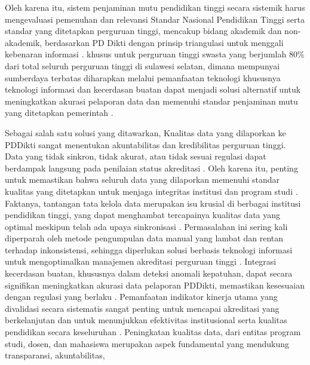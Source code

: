 \documentclass[12pt,a4paper,oneside]{report}
\begin{document}
            Oleh karena itu, sistem penjaminan mutu pendidikan tinggi secara sistemik harus mengevaluasi pemenuhan dan relevansi Standar Nasional Pendidikan Tinggi serta standar yang ditetapkan perguruan tinggi, mencakup bidang akademik dan non-akademik, berdasarkan PD Dikti dengan prinsip triangulasi untuk menggali kebenaran informasi  \parencite{peraturan_menteri_pendidikan_tinggi__sains__dan_teknologi_tentang_penjaminan_mutu_pendidikan_tinggi_4712741f}.
            khusus untuk perguruan tinggi swasta yang berjumlah 80\% dari total seluruh perguruan tinggi di sulawesi selatan, dimana mempunyai sumberdaya terbatas diharapkan melalui pemanfaatan teknologi khususnya teknologi informasi dan kecerdasan buatan dapat menjadi solusi alternatif untuk meningkatkan akurasi pelaporan data dan memenuhi standar penjaminan mutu yang ditetapkan pemerintah  \parencite{mochamad_nashrullah_00046d12}.
        \par
            Sebagai salah satu solusi yang ditawarkan, Kualitas data yang dilaporkan ke PDDikti sangat menentukan akuntabilitas dan kredibilitas perguruan tinggi. Data yang tidak sinkron, tidak akurat, atau tidak sesuai regulasi dapat berdampak langsung pada penilaian status akreditasi  \parencite{andi_mursidi_d2898ec2}.
            Oleh karena itu, penting untuk memastikan bahwa seluruh data yang dilaporkan memenuhi standar kualitas yang ditetapkan untuk menjaga integritas institusi dan program studi  \parencite{undang_undang_republik_indonesia_nomor_12_tahun_2012_tentang_pendidikan_tinggi_5e8158d0}.
            Faktanya, tantangan tata kelola data merupakan isu krusial di berbagai institusi pendidikan tinggi, yang dapat menghambat tercapainya kualitas data yang optimal meskipun telah ada upaya sinkronisasi  \parencite{hanim_maria_astuti_76be24e8}. Permasalahan ini sering kali diperparah oleh metode pengumpulan data manual yang lambat dan rentan terhadap inkonsistensi,
            sehingga diperlukan solusi berbasis teknologi informasi untuk mengoptimalkan manajemen akreditasi perguruan tinggi  \parencite{meuthia_rachmaniah_4adb4d40}. Integrasi kecerdasan buatan, khususnya dalam deteksi anomali kepatuhan, dapat secara signifikan meningkatkan akurasi data pelaporan PDDikti, memastikan kesesuaian dengan regulasi yang berlaku  \parencite{rani_aprillya_putri_416d128a}.
            Pemanfaatan indikator kinerja utama yang divalidasi secara sistematis sangat penting untuk mencapai akreditasi yang berkelanjutan dan untuk menunjukkan efektivitas institusional serta kualitas pendidikan secara keseluruhan  \parencite{saiful_r__mondal_e84f7350}  \parencite{yasir_javed_0c669afc}. Peningkatan kualitas data, dari entitas program studi, dosen, dan mahasiswa merupakan aspek fundamental yang mendukung transparansi, akuntabilitas,
\end{document}
